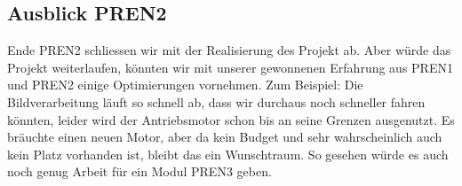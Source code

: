 \subsection{Ausblick PREN2}

Ende PREN2 schliessen wir mit der Realisierung des Projekt ab. Aber würde das Projekt weiterlaufen, könnten wir mit unserer gewonnenen Erfahrung aus PREN1 und PREN2 einige Optimierungen vornehmen.
%
Zum Beispiel: Die Bildverarbeitung läuft so schnell ab, dass wir durchaus noch schneller fahren könnten, leider wird der Antriebsmotor schon bis an seine Grenzen ausgenutzt. Es bräuchte einen neuen Motor, aber da kein Budget und sehr wahrscheinlich auch kein Platz vorhanden ist, bleibt das ein Wunschtraum.
So gesehen würde es auch noch genug Arbeit für ein Modul PREN3 geben.